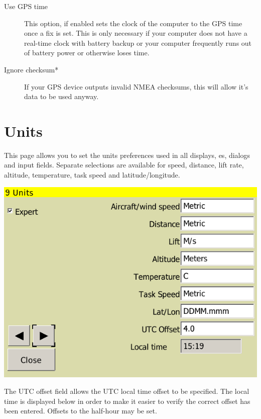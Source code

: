 \documentclass[a4paper,12pt]{refrep}
\begin{document}
\begin{description}
\item[Use GPS time] This option, if enabled sets the clock of the computer to the GPS time once a fix is set.  This is only necessary if your computer does not have a real-time clock with battery backup or your computer frequently runs out of battery power or otherwise loses time.
\item[Ignore checksum*] If your GPS device outputs invalid NMEA checksums, this will allow it's data to be used anyway.
\end{description}

\clearpage
\section{Units}

This page allows you to set the units preferences used in all
displays, {\InfoBox}es, dialogs and input fields.  Separate selections
are available for speed, distance, lift rate, altitude, temperature, task
speed and latitude/longitude.

\begin{center}
\includegraphics[angle=0,width=\linewidth,keepaspectratio='true']{figures/config-7.png}
\end{center}

The UTC offset field allows the UTC local time offset to be specified.
The local time is displayed below in order to make it easier to verify
the correct offset has been entered.  Offsets to the half-hour may be
set.

\end{document}
